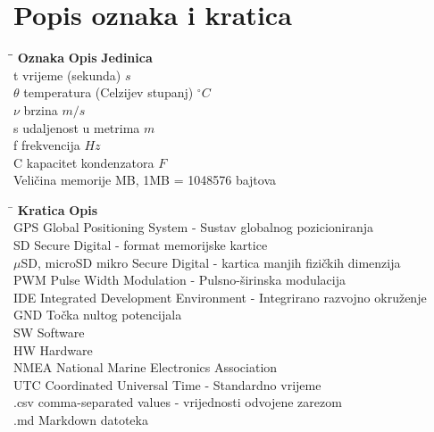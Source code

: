 \chapter*{Popis oznaka i kratica}\label{TOA}

\begin{tabbing}\label{Oznake}
\hspace{60pt}\=\hspace{160pt}\=\kill
 \textbf{Oznaka} \>  \textbf{Opis} \> \textbf{Jedinica} \\ 
 t \>  vrijeme (sekunda) \> $s$ \\ 
 $\theta$ \>  temperatura (Celzijev stupanj) \> $^ \circ C$ \\ 
 $\nu$ \>  brzina \> $m/s$ \\ 
 s \>  udaljenost u metrima \> $m$ \\ 
 f \>  frekvencija \> $Hz$ \\ 
 C \>  kapacitet kondenzatora \> $F$ \\ 
  \> Veličina memorije \> MB, 1MB = 1048576 bajtova
\end{tabbing}


\begin{tabbing}
\hspace{80pt}\=\kill
\textbf{Kratica} \> \textbf{Opis} \\ 
 GPS \> Global Positioning System - Sustav globalnog pozicioniranja  \\ 
 SD \> Secure Digital - format memorijske kartice\\ 
 $\mu$SD, microSD \> mikro Secure Digital - kartica manjih fizičkih dimenzija \\ 
 PWM \> Pulse Width Modulation - Pulsno-širinska modulacija \\ 
 IDE \> Integrated Development Environment  - Integrirano razvojno okruženje \\ 
 GND \> Točka nultog potencijala \\ 
 SW \> Software \\ 
 HW \> Hardware \\ 
 NMEA \> National Marine Electronics Association \\ 
 UTC \> Coordinated Universal Time - Standardno vrijeme \\ 
 .csv \> comma-separated values - vrijednosti odvojene zarezom \\ 
 .md \> Markdown datoteka
\end{tabbing} 